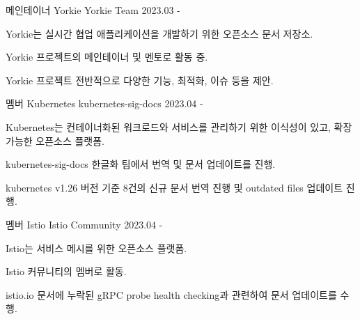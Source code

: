 

\begin{cventries}

  \cventry
    {메인테이너} %
    {Yorkie} %
    {Yorkie Team} %
    {2023.03 - } %
    {
      \begin{cvitems} %
        \item {Yorkie는 실시간 협업 애플리케이션을 개발하기 위한 오픈소스 문서 저장소.}
        \item {Yorkie 프로젝트의 메인테이너 및 멘토로 활동 중.}
        \item {Yorkie 프로젝트 전반적으로 다양한 기능, 최적화, 이슈 등을 제안.}
      \end{cvitems}
    }

  \cventry
  {멤버} %
  {Kubernetes} %
  {kubernetes-sig-docs} %
  {2023.04 - } %
  {
    \begin{cvitems} %
      \item {Kubernetes는 컨테이너화된 워크로드와 서비스를 관리하기 위한 이식성이 있고, 확장 가능한 오픈소스 플랫폼.}
      \item {kubernetes-sig-docs 한글화 팀에서 번역 및 문서 업데이트를 진행.}
      \item {kubernetes v1.26 버전 기준 8건의 신규 문서 번역 진행 및 outdated files 업데이트 진행.}
    \end{cvitems}
  }

  \cventry
    {멤버} %
    {Istio} %
    {Istio Community} %
    {2023.04 - } %
    {
      \begin{cvitems} %
        \item {Istio는 서비스 메시를 위한 오픈소스 플랫폼.}
        \item {Istio 커뮤니티의 멤버로 활동.}
        \item {istio.io 문서에 누락된 gRPC probe health checking과 관련하여 문서 업데이트를 수행.}
      \end{cvitems}
    }

\end{cventries}
